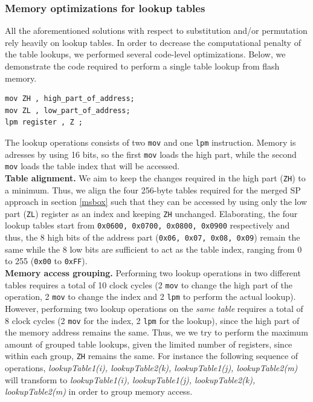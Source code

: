 \documentclass[11pt]{article}
\begin{document}
\subsubsection{Memory optimizations for lookup tables}
All the aforementioned solutions with respect to substitution and/or permutation rely heavily on lookup tables. In order to decrease the computational penalty of the table lookups, we performed several code-level optimizations. Below, we demonstrate the code required to perform a single table lookup from flash memory.
\begin{verbatim}
mov ZH , high_part_of_address; 
mov ZL , low_part_of_address; 
lpm register , Z ;
\end{verbatim}
The lookup operations consists of two \texttt{mov} and one \texttt{lpm} instruction. Memory is adresses by using 16 bits, so the first \texttt{mov} loads the high part, while the second \texttt{mov} loads the table index that will be accessed.\\
\textbf{Table alignment.} We aim to keep the changes required in the high part (\texttt{ZH}) to a minimum. Thus, we align the four 256-byte tables required for the merged SP approach in section \ref{msbox} such that they can be accessed by using only the  low part (\texttt{ZL}) register as an index and keeping \texttt{ZH} unchanged. Elaborating, the four lookup tables start from \texttt{0x0600, 0x0700, 0x0800, 0x0900} respectively and thus, the 8 high bits of the address part (\texttt{0x06, 0x07, 0x08, 0x09}) remain the same while the 8 low bits are sufficient to act as the table index, ranging from 0 to 255 (\texttt{0x00} to \texttt{0xFF}). \\
\textbf{Memory access grouping.} Performing two lookup operations in two different tables requires a total of 10 clock cycles (2 \texttt{mov} to change the high part of the operation, 2 \texttt{mov} to change the index and 2 \texttt{lpm} to perform the actual lookup). However, performing two lookup operations on the \emph{same table} requires a total of 8 clock cycles (2 \texttt{mov} for the index, 2 \texttt{lpm} for the lookup), since the high part of the memory address remains the same. Thus, we 
we try to perform the maximum amount of grouped table lookups, given the limited number of registers, since within each group, \texttt{ZH} remains the same. For instance the following sequence of operations, \emph{ lookupTable1(i), lookupTable2(k), lookupTable1(j), lookupTable2(m)} will transform to \emph{ lookupTable1(i), lookupTable1(j), lookupTable2(k), lookupTable2(m)} in order to group memory access.
\end{document}
